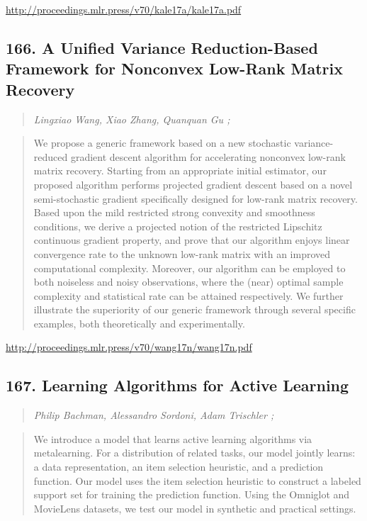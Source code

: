 \documentclass{article}
\begin{document}
\href{http://proceedings.mlr.press/v70/kale17a/kale17a.pdf}{http://proceedings.mlr.press/v70/kale17a/kale17a.pdf}

\subsection{166. A Unified Variance Reduction-Based Framework for Nonconvex Low-Rank Matrix Recovery}

\begin{quote}
\footnotesize{\textit{Lingxiao Wang, Xiao Zhang, Quanquan Gu ;}}

\end{quote}

\begin{quote}
    We propose a generic framework based on a new stochastic variance-reduced gradient descent algorithm for accelerating nonconvex low-rank matrix recovery. Starting from an appropriate initial estimator, our proposed algorithm performs projected gradient descent based on a novel semi-stochastic gradient specifically designed for low-rank matrix recovery. Based upon the mild restricted strong convexity and smoothness conditions, we derive a projected notion of the restricted Lipschitz continuous gradient property, and prove that our algorithm enjoys linear convergence rate to the unknown low-rank matrix with an improved computational complexity. Moreover, our algorithm can be employed to both noiseless and noisy observations, where the (near) optimal sample complexity and statistical rate can be attained respectively. We further illustrate the superiority of our generic framework through several specific examples, both theoretically and experimentally.  
\end{quote}

\href{http://proceedings.mlr.press/v70/wang17n/wang17n.pdf}{http://proceedings.mlr.press/v70/wang17n/wang17n.pdf}

\subsection{167. Learning Algorithms for Active Learning}

\begin{quote}
\footnotesize{\textit{Philip Bachman, Alessandro Sordoni, Adam Trischler ;}}

\end{quote}

\begin{quote}
    We introduce a model that learns active learning algorithms via metalearning. For a distribution of related tasks, our model jointly learns: a data representation, an item selection heuristic, and a prediction function. Our model uses the item selection heuristic to construct a labeled support set for training the prediction function. Using the Omniglot and MovieLens datasets, we test our model in synthetic and practical settings.  
\end{quote}
\end{document}
